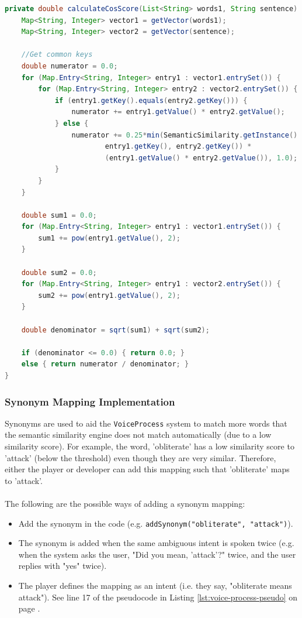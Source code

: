 \documentclass[11pt]{article}
\begin{document}
\begin{lstlisting}[language=Java, caption=SentenceMapper.calculateCosScore(), label=lst:cos-score]
private double calculateCosScore(List<String> words1, String sentence) {
    Map<String, Integer> vector1 = getVector(words1);
    Map<String, Integer> vector2 = getVector(sentence);

    //Get common keys
    double numerator = 0.0;
    for (Map.Entry<String, Integer> entry1 : vector1.entrySet()) {
        for (Map.Entry<String, Integer> entry2 : vector2.entrySet()) {
            if (entry1.getKey().equals(entry2.getKey())) {
                numerator += entry1.getValue() * entry2.getValue();
            } else {
                numerator += 0.25*min(SemanticSimilarity.getInstance().calculateScore(
                        entry1.getKey(), entry2.getKey()) *
                        (entry1.getValue() * entry2.getValue()), 1.0);
            }
        }
    }

    double sum1 = 0.0;
    for (Map.Entry<String, Integer> entry1 : vector1.entrySet()) {
        sum1 += pow(entry1.getValue(), 2);
    }

    double sum2 = 0.0;
    for (Map.Entry<String, Integer> entry1 : vector2.entrySet()) {
        sum2 += pow(entry1.getValue(), 2);
    }

    double denominator = sqrt(sum1) + sqrt(sum2);

    if (denominator <= 0.0) { return 0.0; }
    else { return numerator / denominator; }
}
\end{lstlisting}

\subsubsection{Synonym Mapping Implementation}

Synonyms are used to aid the \texttt{VoiceProcess} system to match more words that the semantic similarity engine does not match automatically (due to a low similarity score). For example, the word, 'obliterate' has a low similarity score to 'attack' (below the threshold) even though they are very similar. Therefore, either the player or developer can add this mapping such that 'obliterate' maps to 'attack'.
\\
\\
The following are the possible ways of adding a synonym mapping:

\begin{itemize}
\item Add the synonym in the code (e.g. \texttt{addSynonym("obliterate", "attack")}).

\item The synonym is added when the same ambiguous intent is spoken twice (e.g. when the system asks the user, "Did you mean, 'attack'?" twice, and the user replies with "yes" twice).

\item The player defines the mapping as an intent (i.e. they say, "obliterate means attack"). See line 17 of the pseudocode in Listing \ref{lst:voice-process-pseudo} on page \pageref{lst:voice-process-pseudo}.
\end{itemize}
\end{document}
